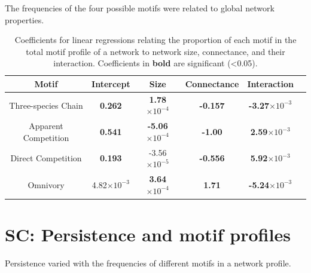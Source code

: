 \documentclass[12pt]{article}
\begin{document}
\begin{spacing}{2.0}
    The frequencies of the four possible motifs were related to global network properties.

    \begin{table}[hb!]
        \centering
        \caption{Coefficients for linear regressions relating the proportion of each motif in the total motif profile of a network to network size, connectance, and their interaction. Coefficients in \textbf{bold} are significant (\textless0.05).}
       \label{network_prop_lms}
       \begin{tabular}{c|c c c c c}
            Motif & Intercept & Size & Connectance & Interaction \\
            \hline
            Three-species Chain & \textbf{0.262} & \textbf{1.78$\times10^{-4}$} & \textbf{-0.157} & \textbf{-3.27$\times10^{-3}$} \\
            Apparent Competition & \textbf{0.541} & \textbf{-5.06$\times10^{-4}$} & \textbf{-1.00} & \textbf{2.59$\times10^{-3}$} \\
            Direct Competition & \textbf{0.193} & -3.56$\times10^{-5}$ & \textbf{-0.556} & \textbf{5.92$\times10^{-3}$} \\
            Omnivory & 4.82$\times10^{-3}$ & \textbf{3.64$\times10^{-4}$} & \textbf{1.71} & \textbf{-5.24$\times10^{-3}$}\\
            \hline
            \end{tabular}
    \end{table}        
\clearpage
    

\section{SC: Persistence and motif profiles}

    Persistence varied with the frequencies of different motifs in a network profile.


\end{spacing}
\end{document}
